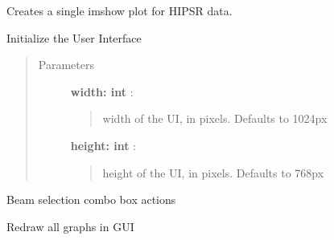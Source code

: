 \documentclass[letterpaper,10pt,english]{sphinxmanual}
\begin{document}
\begin{fulllineitems}
\begin{fulllineitems}
\label{software:hipsr_gui.HipsrGui.createWaterfallPlot}
Creates a single imshow plot for HIPSR data.

\end{fulllineitems}


\begin{fulllineitems}
\label{software:hipsr_gui.HipsrGui.initUI}
Initialize the User Interface
\begin{quote}\begin{description}
\item[{Parameters }] \leavevmode
\textbf{width: int} :
\begin{quote}

width of the UI, in pixels. Defaults to 1024px
\end{quote}

\textbf{height: int} :
\begin{quote}

height of the UI, in pixels. Defaults to 768px
\end{quote}

\end{description}\end{quote}

\end{fulllineitems}


\begin{fulllineitems}
\label{software:hipsr_gui.HipsrGui.onBeamSelect}
Beam selection combo box actions

\end{fulllineitems}


\begin{fulllineitems}
\label{software:hipsr_gui.HipsrGui.updateAllPlots}
Redraw all graphs in GUI

\end{fulllineitems}



\end{fulllineitems}
\end{document}
